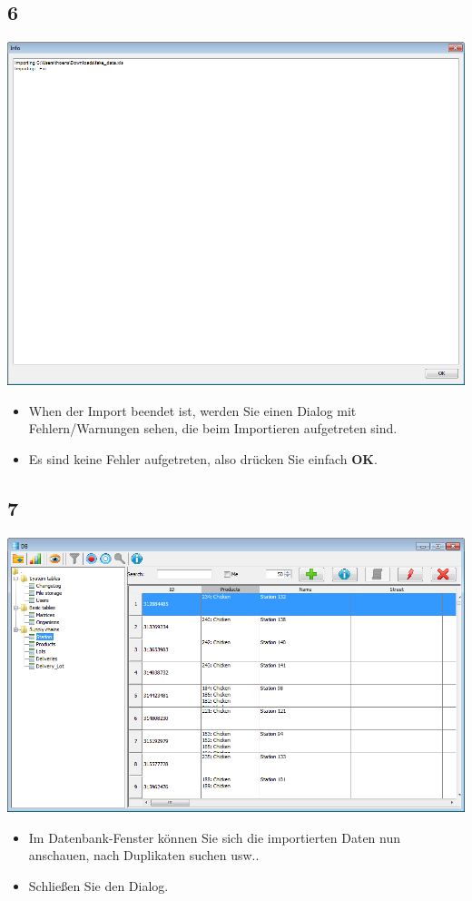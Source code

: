 \documentclass{beamer}
\begin{document}
\subsection{6}
\begin{frame}
	\begin{center}
  		\includegraphics[height=0.6\textheight]{6.png}
	\end{center}
	\begin{itemize}
		\item When der Import beendet ist, werden Sie einen Dialog mit Fehlern/Warnungen sehen, die beim Importieren aufgetreten sind.
		\item Es sind keine Fehler aufgetreten, also drücken Sie einfach \textbf{OK}.
	\end{itemize}
\end{frame}

\subsection{7}
\begin{frame}
	\begin{center}
  		\includegraphics[height=0.6\textheight]{7.png}
	\end{center}
	\begin{itemize}
		\item Im Datenbank-Fenster können Sie sich die importierten Daten nun anschauen, nach Duplikaten suchen usw..
		\item Schließen Sie den Dialog.
	\end{itemize}
\end{frame}
\end{document}
